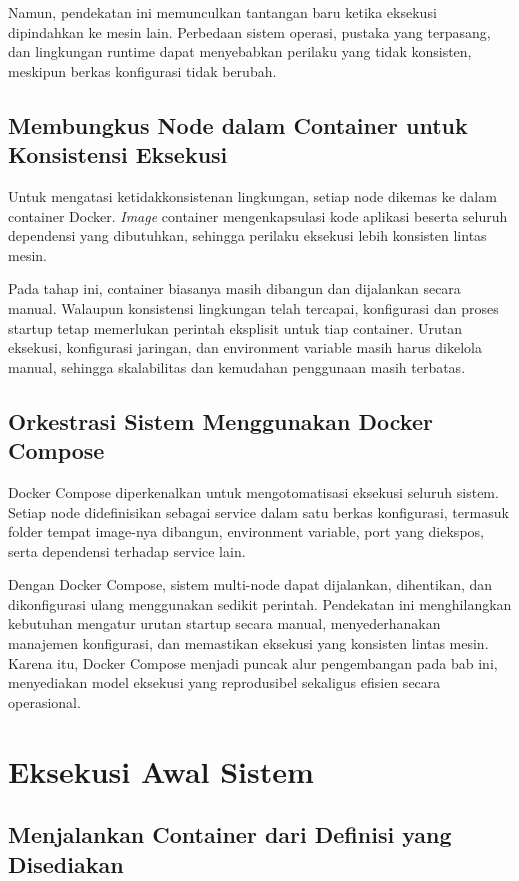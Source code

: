 Namun, pendekatan ini memunculkan tantangan baru ketika eksekusi dipindahkan ke
mesin lain. Perbedaan sistem operasi, pustaka yang terpasang, dan lingkungan
runtime dapat menyebabkan perilaku yang tidak konsisten, meskipun berkas
konfigurasi tidak berubah.

\subsection[Membungkus Node dalam Container]{Membungkus Node dalam Container untuk Konsistensi Eksekusi}

Untuk mengatasi ketidakkonsistenan lingkungan, setiap node dikemas ke dalam
container Docker. \emph{Image} container mengenkapsulasi kode aplikasi beserta
seluruh dependensi yang dibutuhkan, sehingga perilaku eksekusi lebih konsisten
lintas mesin.

Pada tahap ini, container biasanya masih dibangun dan dijalankan secara manual.
Walaupun konsistensi lingkungan telah tercapai, konfigurasi dan proses startup
tetap memerlukan perintah eksplisit untuk tiap container. Urutan eksekusi,
konfigurasi jaringan, dan environment variable masih harus dikelola manual,
sehingga skalabilitas dan kemudahan penggunaan masih terbatas.

\subsection{Orkestrasi Sistem Menggunakan Docker Compose}

Docker Compose diperkenalkan untuk mengotomatisasi eksekusi seluruh sistem.
Setiap node didefinisikan sebagai service dalam satu berkas konfigurasi, termasuk
folder tempat image-nya dibangun, environment variable, port yang diekspos, serta
dependensi terhadap service lain.

Dengan Docker Compose, sistem multi-node dapat dijalankan, dihentikan, dan
dikonfigurasi ulang menggunakan sedikit perintah. Pendekatan ini menghilangkan
kebutuhan mengatur urutan startup secara manual, menyederhanakan manajemen
konfigurasi, dan memastikan eksekusi yang konsisten lintas mesin. Karena itu,
Docker Compose menjadi puncak alur pengembangan pada bab ini, menyediakan model
eksekusi yang reprodusibel sekaligus efisien secara operasional.

\section{Eksekusi Awal Sistem}
\subsection{Menjalankan Container dari Definisi yang Disediakan}
\label{sec:initial_system_execution}

